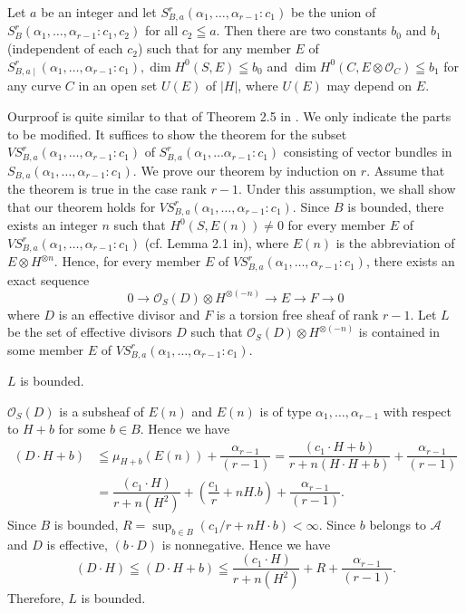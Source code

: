 \begin{Thm}\label{Thm3}
Let $a$ be an integer and let
$S^{r}_{B,a}(\alpha_1,\ldots,\alpha_{r-1}:c_1)$ be the union of
$S^{r}_B(\alpha_1,\ldots,\alpha_{r-1}:c_1,c_2)$  for all $c_2\leqq
a$. Then there are two constants $b_0$ and $b_1$ (independent of each
$c_2$) such that for any member $E$ of $S^{r}_{B,a\mid}
(\alpha_1,\ldots,\alpha_{r-1}:c_1),\dim H^{0}(S,E)\leqq b_0$ and $\dim
H^{0}(C,E\otimes \mathscr{O}_C)\leqq b_1$ for any curve $C$ in an open
set $U(E)$  of $|H|$, where $U(E)$ may depend on $E$. 
\end{Thm}


\begin{Proof}
Our\pageoriginale proof is quite similar to that of Theorem 2.5
in \cite{key8}. We only indicate the parts to be modified. It suffices
to show the theorem for the subset
$VS^{r}_{B,a}(\alpha_1,\ldots,\alpha_{r-1}:c_1)$ of
$S^{r}_{B,a}(\alpha_1,\ldots \alpha_{r-1}:c_1)$ consisting of vector
bundles in $S_{B,a}(\alpha_1,\ldots, \alpha_{r-1}:c_1)$. We prove our
theorem by induction on $r$. Assume that the theorem is true in the
case rank $r-1$. Under this assumption, we shall show that our theorem
holds for $VS^{r}_{B,a}(\alpha_1,\ldots,\alpha_{r-1}:c_1)$. Since $B$
is bounded, there exists an integer $n$ such that $H^{0}(S,E(n))\neq
0$ for every member $E$ of
$VS^{r}_{B,a}(\alpha_1,\ldots, \alpha_{r-1}:c_1)$
(cf. Lemma 2.1 in\cite{key8}), where $E(n)$ is the
abbreviation of $E\otimes H^{\otimes n}$. Hence, for every member $E$
of $VS^{r}_{B,a}(\alpha_1,\ldots,\alpha_{r-1}:c_1)$, there exists an
exact sequence 
$$
0\to \mathscr{O}_S(D)\otimes H^{\otimes(-n)}\to E\to F\to 0
$$
where $D$ is an effective divisor and $F$ is a torsion free sheaf of
rank $r-1$. Let $L$ be the set of effective divisors $D$ such that
$\mathscr{O}_{S}(D)\otimes H^{\otimes(-n)}$  is contained in some
member $E$ of $VS^{r}_{B,a}(\alpha_1,\ldots,\alpha_{r-1}:c_1)$.

\begin{claim}
$L$ is bounded.
\end{claim}
$\mathscr{O}_S(D)$ is a subsheaf of $E(n)$ and $E(n)$ is of type
$\alpha_1,\ldots,\alpha_{r-1}$ with respect to $H+b$ for some $b\in
B$. Hence we have 
$$
\begin{aligned}
(D\cdot
H+b)&\leqq \mu_{H+b}(E(n))+\dfrac{\alpha_{r-1}}{(r-1)}=\dfrac{(c_1\cdot
H+b)}{r+n(H\cdot H+b)}+\dfrac{\alpha_{r-1}}{(r-1)}\\
&{}=\dfrac{(c_1\cdot H)}{r+n(H^{2})}+\left(\dfrac{c_1}{r}+nH.b\right)+\dfrac{\alpha_{r-1}}{(r-1)}.
\end{aligned}
$$
\pageoriginale
Since $B$ is bounded, $R=\displaystyle\mathop{sup}_{b\in 
B}(c_1/r+nH\cdot b)<\infty$. Since $b$ belongs to $\mathscr{A}$ and $D$ is
effective, $(b\cdot D)$ is nonnegative. Hence we have 
$$
(D\cdot H)\leqq (D\cdot H+b)\leqq \dfrac{(c_1\cdot H)}{r+n(H^{2})}+R+\dfrac{\alpha_{r-1}}{(r-1)}.
$$
Therefore, $L$ is bounded. 


\end{Proof}
